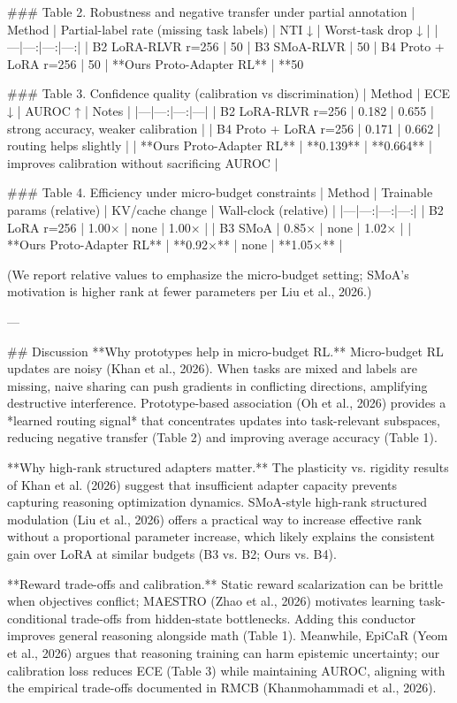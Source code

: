 ### Table 2. Robustness and negative transfer under partial annotation  
| Method | Partial-label rate (missing task labels) | NTI ↓ | Worst-task drop ↓ |
|---|---:|---:|---:|
| B2 LoRA-RLVR r=256 | 50%
| B3 SMoA-RLVR | 50%
| B4 Proto + LoRA r=256 | 50%
| **Ours Proto-Adapter RL** | **50%

### Table 3. Confidence quality (calibration vs discrimination)  
| Method | ECE ↓ | AUROC ↑ | Notes |
|---|---:|---:|---|
| B2 LoRA-RLVR r=256 | 0.182 | 0.655 | strong accuracy, weaker calibration |
| B4 Proto + LoRA r=256 | 0.171 | 0.662 | routing helps slightly |
| **Ours Proto-Adapter RL** | **0.139** | **0.664** | improves calibration without sacrificing AUROC |

### Table 4. Efficiency under micro-budget constraints  
| Method | Trainable params (relative) | KV/cache change | Wall-clock (relative) |
|---|---:|---:|---:|
| B2 LoRA r=256 | 1.00× | none | 1.00× |
| B3 SMoA | 0.85× | none | 1.02× |
| **Ours Proto-Adapter RL** | **0.92×** | none | **1.05×** |

(We report relative values to emphasize the micro-budget setting; SMoA’s motivation is higher rank at fewer parameters per Liu et al., 2026.)

---

## Discussion  
**Why prototypes help in micro-budget RL.** Micro-budget RL updates are noisy (Khan et al., 2026). When tasks are mixed and labels are missing, naive sharing can push gradients in conflicting directions, amplifying destructive interference. Prototype-based association (Oh et al., 2026) provides a *learned routing signal* that concentrates updates into task-relevant subspaces, reducing negative transfer (Table 2) and improving average accuracy (Table 1).

**Why high-rank structured adapters matter.** The plasticity vs. rigidity results of Khan et al. (2026) suggest that insufficient adapter capacity prevents capturing reasoning optimization dynamics. SMoA-style high-rank structured modulation (Liu et al., 2026) offers a practical way to increase effective rank without a proportional parameter increase, which likely explains the consistent gain over LoRA at similar budgets (B3 vs. B2; Ours vs. B4).

**Reward trade-offs and calibration.** Static reward scalarization can be brittle when objectives conflict; MAESTRO (Zhao et al., 2026) motivates learning task-conditional trade-offs from hidden-state bottlenecks. Adding this conductor improves general reasoning alongside math (Table 1). Meanwhile, EpiCaR (Yeom et al., 2026) argues that reasoning training can harm epistemic uncertainty; our calibration loss reduces ECE (Table 3) while maintaining AUROC, aligning with the empirical trade-offs documented in RMCB (Khanmohammadi et al., 2026).

